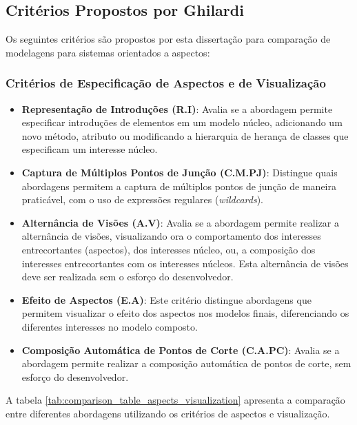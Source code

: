 \subsection{Critérios Propostos por Ghilardi}

Os seguintes critérios são propostos por esta dissertação para comparação de modelagens para sistemas orientados a aspectos:

\subsubsection{Critérios de Especificação de Aspectos e de Visualização}

\begin{itemize}
	\item \textbf{Representação de Introduções (R.I)}: Avalia se a abordagem permite especificar introduções de elementos em um modelo núcleo,
	adicionando um novo método, atributo ou modificando a hierarquia de herança de classes que especificam um interesse núcleo.
	\item \textbf{Captura de Múltiplos Pontos de Junção (C.M.PJ)}: Distingue quais abordagens
	permitem a captura de múltiplos pontos de junção de maneira praticável, com o uso de expressões regulares (\textit{wildcards}).
	\item \textbf{Alternância de Visões (A.V)}: Avalia se a abordagem permite realizar a alternância de visões, visualizando ora o comportamento dos
	interesses entrecortantes (aspectos), dos interesses núcleo, ou, a composição dos interesses entrecortantes com os interesses núcleos. Esta alternância de visões deve 
	ser realizada sem o esforço do desenvolvedor.
	\item \textbf{Efeito de Aspectos (E.A)}: Este critério distingue abordagens que permitem visualizar o efeito dos aspectos nos modelos finais,
	diferenciando os diferentes interesses no modelo composto.
	\item \textbf{Composição Automática de Pontos de Corte (C.A.PC)}: Avalia se a abordagem permite realizar a composição automática de pontos de corte,
	sem esforço do desenvolvedor.
\end{itemize}

A tabela \ref{tab:comparison_table_aspects_visualization} apresenta a comparação entre diferentes abordagens utilizando os critérios de aspectos e
visualização.

